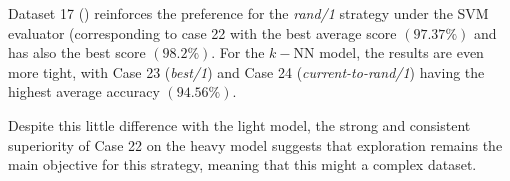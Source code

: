 \documentclass[12pt, openany]{article}
\begin{document}
Dataset 17 () reinforces the preference for the \textit{rand/1} strategy under the SVM evaluator (corresponding to case 22 with the best average score $(97.37\%)$ and has also the best score $(98.2\%)$. For the $k-$NN model, the results are even more tight, with Case 23 (\textit{best/1}) and Case 24 (\textit{current-to-rand/1}) having the highest average accuracy $(94.56\%)$.

Despite this little difference with the light model, the strong and consistent superiority of Case 22 on the heavy model suggests that exploration remains the main objective for this strategy, meaning that this might a complex dataset.

\begin{table}[H]
    \centering
    \renewcommand{\arraystretch}{1.2}
\end{table}
\end{document}

